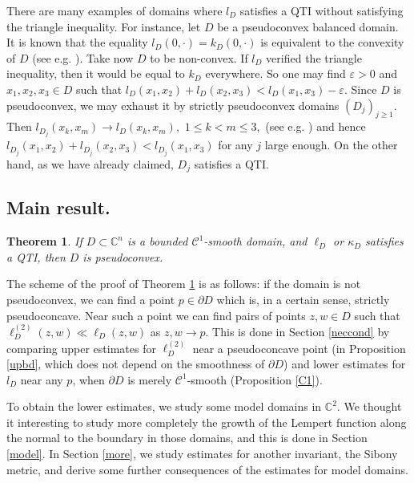 \documentclass[a4paper,12pt]{amsart}
\def\C{\mathbb C}
\newtheorem{thm}{Theorem}
\newcommand{\eps}{\varepsilon}
\begin{document}
There are many examples of domains where $l_D$ satisfies a QTI without satisfying the triangle inequality.
For instance, let $D$ be a pseudoconvex balanced domain. It is known that the
equality $l_D(0,\cdot)=k_D(0,\cdot)$ is equivalent to the convexity of $D$ (see e.g. \cite[Proposition 4.3.10 (b)]{JP}).
Take now $D$ to be non-convex. If $l_D$ verified the triangle inequality,
then it would be equal to $k_D$ everywhere. So one may find $\eps>0$ and $x_1,x_2,x_3\in D$
such that $l_D(x_1,x_2)+l_D(x_2,x_3)<l_D(x_1,x_3)-\eps.$ Since $D$ is pseudoconvex, we may exhaust it by strictly
pseudoconvex domains $(D_j)_{j\ge 1}.$ Then $l_{D_j}(x_k,x_m)\to l_D(x_k,x_m),$ $1\le k<m\le 3,$ (see e.g.
\cite[Proposition 3.3.5 (a)]{JP}) and hence $l_{D_j}(x_1,x_2)+l_{D_j}(x_2,x_3)<l_{D_j}(x_1,x_3)$ for
any $j$ large enough. On the other hand, as we have already claimed, $D_j$ satisfies a QTI.



\subsection{Main result.}

\begin{thm}
\label{pcnc}
If $D \subset \C^n$ is a bounded $\mathcal C^1$-smooth domain, and $\ell_D$ or $\kappa_D$ satisfies a QTI,
then $D$ is pseudoconvex.
\end{thm}

The scheme of the proof of Theorem \ref{pcnc} is as follows: if the domain is not pseudoconvex, we can find a point $p\in \partial D$
which is, in a certain sense, strictly pseudoconcave.  Near such a point we can find pairs of points $z,w \in D$
such that $\ell_D^{(2)}(z,w)  \ll\ell_D(z,w)$ as $z,w \to p$. This is done in Section \ref{neccond} by comparing
upper estimates for $\ell_D^{(2)}$ near a pseudoconcave point (in
Proposition \ref{upbd}, which does not depend on the smoothness
of $\partial D$) and lower estimates for $l_D$ near any $p$, 
when $\partial D$ is merely
$\mathcal C^{1}$-smooth (Proposition \ref{C1}).

To obtain the lower estimates, we study some model domains in $\C^2$. We thought it interesting to study more
completely the growth of the Lempert function along the normal to the boundary in those domains,
and this is done in Section \ref{model}. In Section \ref{more}, 
we study estimates for another invariant, the Sibony metric, and
derive some further consequences of the estimates for model domains.
\end{document}
